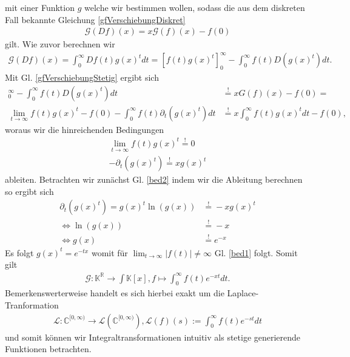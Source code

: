 \documentclass[a4paper,11pt]{article}
\theoremstyle{mytheor}
\newcommand{\R}[0]{\mathbb{R}}
\newcommand{\C}[0]{\mathbb{C}}
\newcommand{\K}[0]{\mathbb{K}}
\begin{document}
mit einer Funktion $g$ welche wir bestimmen wollen, sodass die aus dem diskreten Fall bekannte Gleichung \ref{gfVerschiebungDiskret}
\begin{align}
    \mathcal{G}(Df)(x) = x \mathcal{G}(f)(x) - f(0) \label{gfVerschiebungStetig}
\end{align}
gilt.
Wie zuvor berechnen wir
\begin{align*}
    \mathcal{G}(Df)(x) = \int_0^\infty Df(t) g(x)^t dt = [f(t) g(x)^t]_0^\infty - \int_0^\infty f(t) D(g(x)^t) dt.
\end{align*}
Mit Gl. \ref{gfVerschiebungStetig} ergibt sich
\begin{align*}
    [f(t) g(x)^t]_0^\infty - \int_0^\infty f(t) D(g(x)^t) dt                          & \overset{!}{=} x G(f)(x) - f(0) =                    \\
    \lim_{t \to \infty} f(t) g(x)^t - f(0) - \int_0^\infty f(t) \partial_t(g(x)^t) dt & \overset{!}{=} x\int_0^\infty f(t) g(x)^t dt - f(0),
\end{align*}
woraus wir die hinreichenden Bedingungen
\begin{align}
    \lim_{t \to \infty} f(t) g(x)^t \overset{!}{=} 0 \label{bed1} \\
    -\partial_t(g(x)^t) \overset{!}{=} xg(x)^t \label{bed2}
\end{align}
ableiten. Betrachten wir zunächst Gl. \ref{bed2} indem wir die Ableitung berechnen so ergibt sich
\begin{align*}
    \partial_t (g(x)^t) = g(x)^t \ln(g(x)) & \overset{!}{=} -xg(x)^t \\
    \iff \ln(g(x))                         & \overset{!}{=} -x       \\
    \iff g(x)                              & \overset{!}{=} e^{-x}
\end{align*}
Es folgt $g(x)^t = e^{-tx}$ womit für $\lim_{t \to \infty} |f(t)| \neq \infty$ Gl. \ref{bed1} folgt.
Somit gilt
\begin{align*}
    \mathcal{G} : \K^\R \to \int \K[x], f \mapsto \int_0^\infty f(t) e^{-xt} dt.
\end{align*}
Bemerkenswerterweise handelt es sich hierbei exakt um die Laplace-Tranformation
\begin{align*}
    \mathcal{L} : \C^{[0,\infty)} \to \mathcal{L}\left(\C^{[0,\infty)}\right), \mathcal{L}(f)(s) := \int_0^\infty f(t) e^{-st} dt
\end{align*}
und somit können wir Integraltransformationen intuitiv als stetige generierende Funktionen betrachten.
\end{document}
